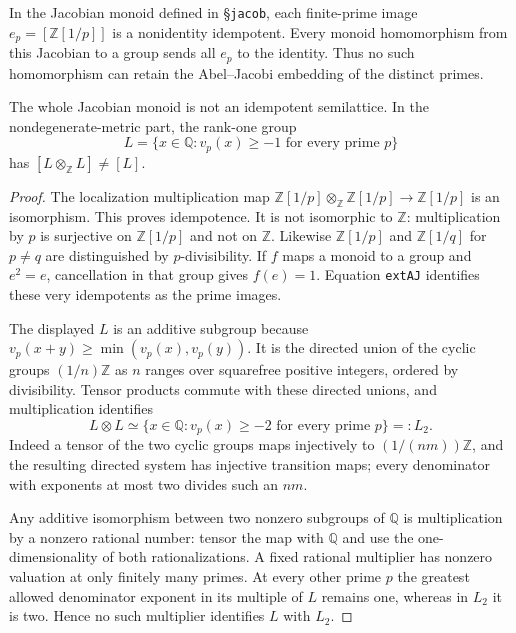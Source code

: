 \begin{proposition}
\label{AC-G14}
In the Jacobian monoid defined in \S\texttt{jacob}, each finite-prime
image $e_p=[\mathbb Z[1/p]]$ is a nonidentity idempotent.  Every monoid
homomorphism from this Jacobian to a group sends all $e_p$ to the
identity.  Thus no such homomorphism can retain the Abel--Jacobi
embedding of the distinct primes.

The whole Jacobian monoid is not an idempotent semilattice.  In the
nondegenerate-metric part, the rank-one group
\[
 L=\{x\in\mathbb Q:v_p(x)\geq-1\text{ for every prime }p\}
\]
has $[L\otimes_{\mathbb Z}L]\ne[L]$.
\end{proposition}
\begin{proof}
The localization multiplication map
$\mathbb Z[1/p]\otimes_{\mathbb Z}\mathbb Z[1/p]
\longrightarrow\mathbb Z[1/p]$ is an isomorphism.  This proves
idempotence.  It is not isomorphic to $\mathbb Z$: multiplication by
$p$ is surjective on $\mathbb Z[1/p]$ and not on $\mathbb Z$.
Likewise $\mathbb Z[1/p]$ and $\mathbb Z[1/q]$ for $p\ne q$ are
distinguished by $p$-divisibility.  If $f$ maps a monoid to a group and
$e^2=e$, cancellation in that group gives $f(e)=1$.  Equation
\texttt{extAJ} identifies these very idempotents as the prime images.

The displayed $L$ is an additive subgroup because
$v_p(x+y)\geq\min(v_p(x),v_p(y))$.  It is the directed union of the
cyclic groups $(1/n)\mathbb Z$ as $n$ ranges over squarefree positive
integers, ordered by divisibility.  Tensor products commute with
these directed unions, and multiplication identifies
\[
 L\otimes L\simeq
 \{x\in\mathbb Q:v_p(x)\geq-2\text{ for every prime }p\}=:L_2.
\]
Indeed a tensor of the two cyclic groups maps injectively to
$(1/(nm))\mathbb Z$, and the resulting directed system has injective
transition maps; every denominator with exponents at most two divides
such an $nm$.

Any additive isomorphism between two nonzero subgroups of
$\mathbb Q$ is multiplication by a nonzero rational number: tensor the
map with $\mathbb Q$ and use the one-dimensionality of both
rationalizations.  A fixed rational multiplier has nonzero valuation
at only finitely many primes.  At every other prime $p$ the greatest
allowed denominator exponent in its multiple of $L$ remains one,
whereas in $L_2$ it is two.  Hence no such multiplier identifies $L$
with $L_2$.
\end{proof}

